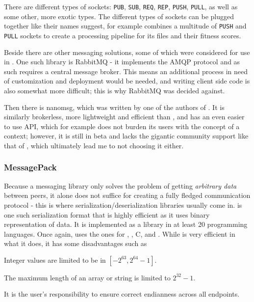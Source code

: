 There are different types of sockets: \texttt{PUB}, \texttt{SUB}, \texttt{REQ}, \texttt{REP}, \texttt{PUSH}, 
\texttt{PULL}, as well as some other, more exotic types. The different types of sockets can be plugged together
like their names suggest, for example \xmlmate combines a multitude of \texttt{PUSH} and \texttt{PULL} sockets
to create a processing pipeline for its \xml files and their fitness scores.

Beside \zmq there are other messaging solutions, some of which were considered for use in \xmlmate. One such
library is {\small RabbitMQ}\cite{rabbitmq} - it implements the AMQP protocol and as such requires a central
message broker. This means an additional process in need of customization and deployment would be needed, and
writing client side code is also somewhat more difficult; this is why {\small RabbitMQ} was decided against.

Then there is {\small nanomsg}\cite{nanomsg}, which was written by one of the authors of \zmq. 
It is similarly brokerless, more lightweight and efficient than \zmq, and has an even easier to use API, which
for example does not burden its users with the concept of a context; however, it is still in beta and lacks
the gigantic community support like that of \zmq, which ultimately lead me to not choosing it either.
\tocless\subsubsection{MessagePack}
\label{sec:msgpack}
Because a messaging library only solves the problem of getting \emph{arbitrary data} between peers, it 
alone does not suffice for creating a fully fledged communication protocol - this is where
serialization/deserialization libraries usually come in. \msgpack{}\cite{msgpack} is one such serialization
format that is highly efficient as it uses binary representation of data. It is implemented as a library in at
least 20 programming languages. Once again, \xmlmate uses the ones for \java, \python, {\small C}, and \cpp.
While \msgpack is very efficient in what it does, it has some disadvantages such as 
\begin{itemize*}
  \item Integer values are limited to be in $[-2^{63}, 2^{64}-1]$.
  \item The maximum length of an array or string is limited to $2^{32}-1$.
  \item It is the user's responsibility to ensure correct endianness across all endpoints.
\end{itemize*}

